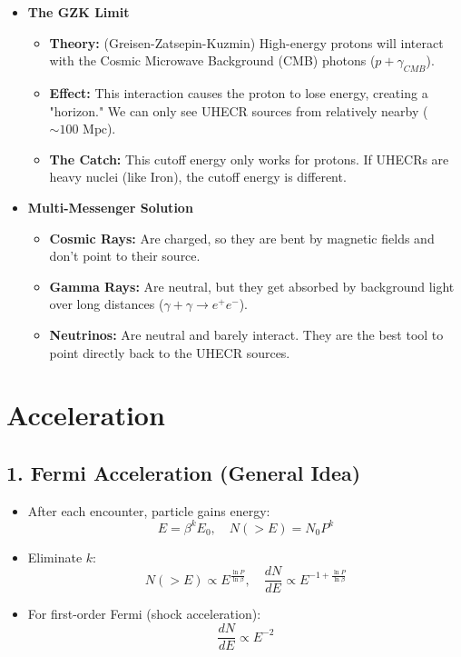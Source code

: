 \documentclass{sciposter}
\begin{document}
\begin{multicols}{3}
\begin{itemize}
    \item \textbf{The GZK Limit}
    \begin{itemize}
        \item \textbf{Theory:} (Greisen-Zatsepin-Kuzmin) High-energy protons will interact with the Cosmic Microwave Background (CMB) photons ($p + \gamma_{CMB}$).
        \item \textbf{Effect:} This interaction causes the proton to lose energy, creating a "horizon." We can only see UHECR sources from relatively nearby ($\sim 100 \text{ Mpc}$).
        \item \textbf{The Catch:} This cutoff energy only works for protons. If UHECRs are heavy nuclei (like Iron), the cutoff energy is different.
    \end{itemize}

    \item \textbf{Multi-Messenger Solution}
    \begin{itemize}
        \item \textbf{Cosmic Rays:} Are charged, so they are bent by magnetic fields and don't point to their source.
        \item \textbf{Gamma Rays:} Are neutral, but they get absorbed by background light over long distances ($\gamma + \gamma \rightarrow e^+e^-$).
        \item \textbf{Neutrinos:} Are neutral and barely interact. They are the best tool to point directly back to the UHECR sources.
    \end{itemize}
\end{itemize}



\section{Acceleration}

\subsection*{1. Fermi Acceleration (General Idea)}
\begin{itemize}
    \item After each encounter, particle gains energy:
    \[
        E = \beta^k E_0, \quad N(>E) = N_0 P^k
    \]
    \item Eliminate $k$:
    \[
        N(>E) \propto E^{\frac{\ln P}{\ln \beta}}, \quad 
        \frac{dN}{dE} \propto E^{-1 + \frac{\ln P}{\ln \beta}}
    \]
    \item For first-order Fermi (shock acceleration): 
    \[
        \frac{dN}{dE} \propto E^{-2}
    \]
\end{itemize}


\end{multicols}
\end{document}
